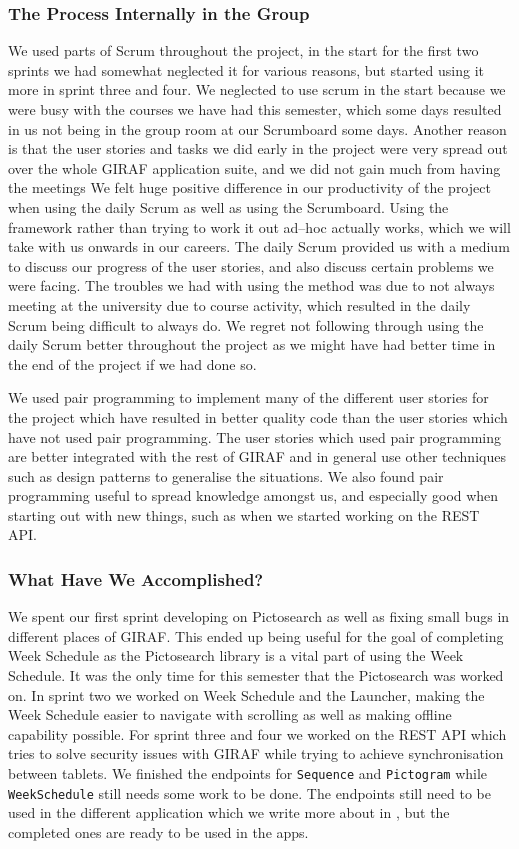 \subsubsection*{The Process Internally in the Group}
We used parts of Scrum throughout the project, in the start for the first two sprints we had somewhat neglected it for various reasons, but started using it more in sprint three and four.
We neglected to use scrum in the start because we were busy with the courses we have had this semester, which some days resulted in us not being in the group room at our Scrumboard some days.
Another reason is that the user stories and tasks we did early in the project were very spread out over the whole GIRAF application suite, and we did not gain much from having the meetings
We felt huge positive difference in our productivity of the project when using the daily Scrum as well as using the Scrumboard.
Using the framework rather than trying to work it out ad--hoc actually works, which we will take with us onwards in our careers.
The daily Scrum provided us with a medium to discuss our progress of the user stories, and also discuss certain problems we were facing.
The troubles we had with using the method was due to not always meeting at the university due to course activity, which resulted in the daily Scrum being difficult to always do.
We regret not following through using the daily Scrum better throughout the project as we might have had better time in the end of the project if we had done so.

We used pair programming to implement many of the different user stories for the project which have resulted in better quality code than the user stories which have not used pair programming.
The user stories which used pair programming are better integrated with the rest of GIRAF and in general use other techniques such as design patterns to generalise the situations.
We also found pair programming useful to spread knowledge amongst us, and especially good when starting out with new things, such as when we started working on the REST API.

\subsubsection*{What Have We Accomplished?}
We spent our first sprint developing on Pictosearch as well as fixing small bugs in different places of GIRAF.
This ended up being useful for the goal of completing Week Schedule as the Pictosearch library is a vital part of using the Week Schedule.
It was the only time for this semester that the Pictosearch was worked on.
In sprint two we worked on Week Schedule and the Launcher, making the Week Schedule easier to navigate with scrolling as well as making offline capability possible.
For sprint three and four we worked on the REST API which tries to solve security issues with GIRAF while trying to achieve synchronisation between tablets.
We finished the endpoints for \texttt{Sequence} and \texttt{Pictogram} while \texttt{WeekSchedule} still needs some work to be done.
The endpoints still need to be used in the different application which we write more about in , but the completed ones are ready to be used in the apps.

